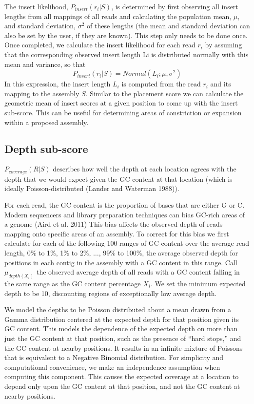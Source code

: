 \documentclass[phd,tocprelim]{cornell}
\begin{document}
The insert likelihood, $P_{insert}\left(r_{i}|S\right)$, is determined by first observing all insert lengths from all mappings of all reads and calculating the population mean, $\mu$, and standard deviation, $\sigma^{2}$ of these lengths (the mean and standard deviation can also be set by the user, if they are known). This step only needs to be done once.  Once completed, we calculate the insert likelihood for each read $r_{i}$ by assuming that the corresponding observed insert length Li is distributed normally with this mean and variance, so that
\begin{equation}
    P_{insert}\left(r_{i}|S\right) = Normal\left(L_{i};\mu,\sigma^{2}\right)
\end{equation}
In this expression, the insert length $L_{i}$ is computed from the read $r_{i}$ and its mapping to the assembly $S$. Similar to the placement score we can calculate the geometric mean of insert scores at a given position to come up with the insert sub-score. This can be useful for determining areas of constriction or expansion within a proposed assembly.


\subsection{Depth sub-score} %
\label{sub:Depth sub-score}

$P_{coverage}(R|S)$ describes how well the depth at each location agrees with the depth that we would expect given the GC content at that location (which is ideally Poisson-distributed (Lander and Waterman 1988)).

For each read, the GC content is the proportion of bases that are either G or C. Modern sequencers and library preparation techniques can bias GC-rich areas of a genome (Aird et al. 2011) This bias affects the observed depth of reads mapping onto specific areas of an assembly. To correct for this bias we first calculate for each of the following 100 ranges of GC content over the average read length, 0\% to 1\%, 1\% to 2\%, $\ldots$, 99\% to 100\%, the average observed depth for positions in each contig in the assembly with a GC content in this range. Call $\mu_{depth(X_{i})}$ the observed average depth of all reads with a GC content falling in the same range as the GC content percentage $X_{i}$. We set the minimum expected depth to be 10, discounting regions of exceptionally low average depth.

We model the depths to be Poisson distributed about a mean drawn from a Gamma distribution centered at the expected depth for that position given its GC content. This models the dependence of the expected depth on more than just the GC content at that position, such as the presence of “hard stops,” and the GC content at nearby positions. It results in an infinite mixture of Poissons that is equivalent to a Negative Binomial distribution. For simplicity and computational convenience, we make an independence assumption when computing this component.  This causes the expected coverage at a location to depend only upon the GC content at that position, and not the GC content at nearby positions.
\end{document}
